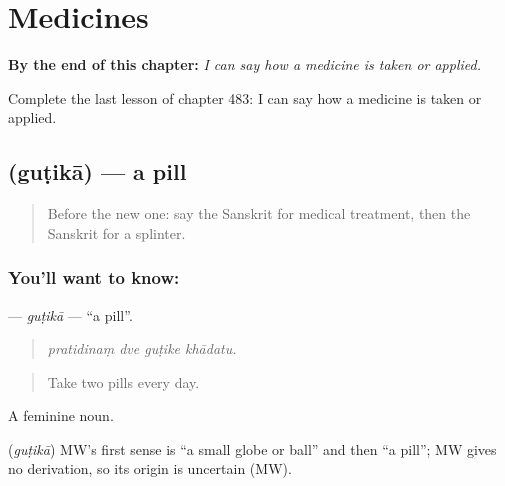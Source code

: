 
\chapter{Medicines}
\label{ch:sa-medicines}

\begin{chapteropening}
\textbf{By the end of this chapter:} \emph{I can say how a medicine is taken or applied.}

Complete the last lesson of chapter 483: I can say how a medicine is taken or applied.
\end{chapteropening}

\section[\texorpdfstring{\sk{गुटिका} (guṭikā)}{गुटिका (guṭikā)}]{ (guṭikā) — a pill}

\label{lesson:SA-C483-gutika}



\begin{quote}
Before the new one: say the Sanskrit for medical treatment, then the Sanskrit for a splinter.
\end{quote}

\subsection*{You'll want to know: }
\textbf{} — \emph{guṭikā} — \textquotedblleft{}a pill\textquotedblright{}.

\begin{quote}
   
\end{quote}

\begin{quote}
\emph{pratidinaṃ dve guṭike khādatu.}
\end{quote}

\begin{quote}
Take two pills every day.
\end{quote}

A feminine noun.

\begin{cousinweb}
\textbf{} (\emph{guṭikā}) MW's first sense is \textquotedblleft{}a small globe or ball\textquotedblright{} and then \textquotedblleft{}a pill\textquotedblright{}; MW gives no derivation, so its origin is uncertain (MW).
\end{cousinweb}

